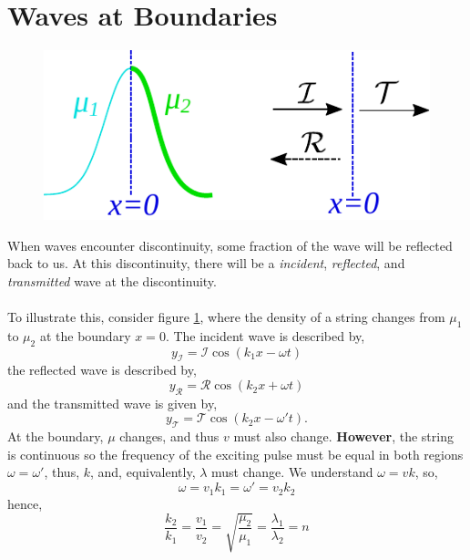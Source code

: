 \documentclass{book}
\begin{document}
\section{Waves at Boundaries}
\begin{figure}
    \centering
    \includegraphics{reflected.pdf}
    \caption{}
    \label{fig:reflected}
\end{figure} \noindent
When waves encounter discontinuity, some fraction of the wave will be reflected back to us. At this discontinuity, there will be a \textit{incident}, \textit{reflected}, and \textit{transmitted} wave at the discontinuity.\\\\
To illustrate this, consider figure \ref{fig:reflected}, where the density of a string changes from $\mu_1$ to $\mu_2$ at the boundary $x=0$. The incident wave is described by,
\begin{equation}
    y_{\mathcal{I}} = \mathcal{I}\cos(k_1x - \omega t)
\end{equation}
the reflected wave is described by,
\begin{equation}
    y_{\mathcal{R}} = \mathcal{R}\cos(k_2x + \omega t)\end{equation}
and the transmitted wave is given by,
\begin{equation}
    y_{\mathcal{T}} = \mathcal{T}\cos(k_2x - \omega't).
\end{equation}
At the boundary, $\mu$ changes, and thus $v$ must also change. \textbf{However}, the string is continuous so the frequency of the exciting pulse must be equal in both regions $\omega = \omega'$, thus, $k$, and, equivalently, $\lambda$ must change. We understand $\omega = vk$, so,
\begin{equation}
    \omega = v_1k_1 = \omega' = v_2k_2
\end{equation}
hence,
\begin{equation}
    \frac{k_2}{k_1} = \frac{v_1}{v_2} = \sqrt{\frac{\mu_2}{\mu_1}} =\frac{\lambda_1}{\lambda_2} = n
\end{equation}
\end{document}
